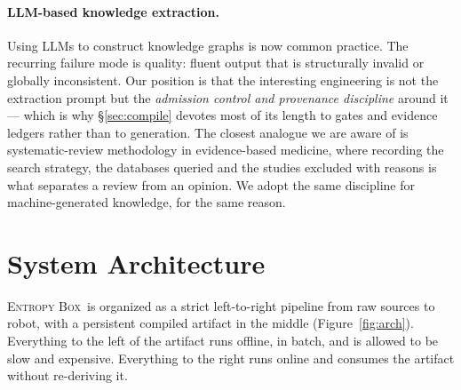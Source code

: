 \documentclass[10pt,a4paper]{article}
\newcommand{\eb}{\textsc{Entropy Box}\xspace}
\begin{document}
\paragraph{LLM-based knowledge extraction.}
Using LLMs to construct knowledge graphs is now common practice. The recurring
failure mode is quality: fluent output that is structurally invalid or globally
inconsistent. Our position is that the interesting engineering is not the
extraction prompt but the \emph{admission control and provenance discipline}
around it --- which is why \S\ref{sec:compile} devotes most of its length to
gates and evidence ledgers rather than to generation. The closest analogue we are
aware of is systematic-review methodology in evidence-based medicine, where
recording the search strategy, the databases queried and the studies excluded
with reasons is what separates a review from an opinion. We adopt the same
discipline for machine-generated knowledge, for the same reason.

\section{System Architecture}
\label{sec:arch}

\eb\ is organized as a strict left-to-right pipeline from raw sources to robot,
with a persistent compiled artifact in the middle
(Figure~\ref{fig:arch}). Everything to the left of the artifact runs offline, in
batch, and is allowed to be slow and expensive. Everything to the right runs
online and consumes the artifact without re-deriving it.
\end{document}
